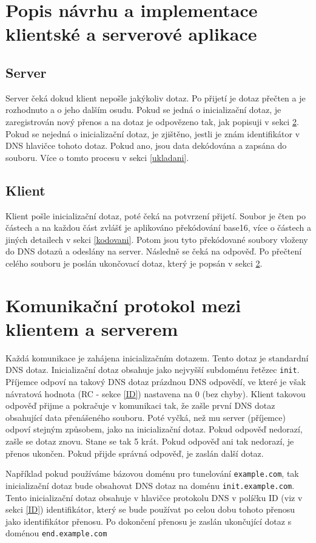\documentclass[11pt]{article}
\begin{document}
\section{Popis návrhu a implementace klientské a serverové aplikace}
\subsection{Server}
Server čeká dokud klient nepošle jakýkoliv dotaz. Po přijetí je dotaz přečten a je rozhodnuto a o jeho dalším osudu. Pokud se jedná o inicializační dotaz, je zaregistrován nový přenos a na dotaz je odpovězeno tak, jak popisuji v sekci \ref{protokol}. Pokud se nejedná o inicializační dotaz, je zjištěno, jestli je znám identifikátor v DNS hlavičce tohoto dotaz. Pokud ano, jsou data dekódována a zapsána do souboru. Více o tomto procesu v sekci \ref{ukladani}.

\subsection{Klient}
Klient pošle inicializační dotaz, poté čeká na potvrzení přijetí. Soubor je čten po částech a na každou část zvlášť je aplikováno překódování base16, více o částech a jiných detailech v sekci \ref{kodovani}. Potom jsou tyto překódované soubory vloženy do DNS dotazů a odeslány na server. Následně se čeká na odpověď. Po přečtení celého souboru je poslán ukončovací dotaz, který je popsán v sekci \ref{protokol}.



\section{Komunikační protokol mezi klientem a serverem} \label{protokol}
Každá komunikace je zahájena inicializačním dotazem. Tento dotaz je standardní DNS dotaz. Inicializační dotaz obsahuje jako nejvyšší subdoménu řetězec \texttt{init}. Příjemce odpoví na takový DNS dotaz prázdnou DNS odpovědí, ve které je však návratová hodnota (RC - sekce \ref{ID}) nastavena na 0 (bez chyby). Klient takovou odpověď přijme a pokračuje v komunikaci tak, že zašle první DNS dotaz obsahující data přenášeného souboru. Poté vyčká, než mu server (příjemce) odpoví stejným způsobem, jako na inicializační dotaz. Pokud odpověď nedorazí, zašle se dotaz znovu. Stane se tak 5 krát. Pokud odpověď ani tak nedorazí, je přenos ukončen. Pokud přijde správná odpověď, je zaslán další dotaz.

Například pokud používáme bázovou doménu pro tunelování \texttt{example.com}, tak inicializační dotaz bude obsahovat DNS dotaz na doménu \texttt{init.example.com}. Tento inicializační dotaz obsahuje v hlavičce protokolu DNS v políčku ID (viz v sekci \ref{ID}) identifikátor, který se bude používat po celou dobu tohoto přenosu jako identifikátor přenosu. Po dokončení přenosu je zaslán ukončující dotaz s doménou \texttt{end.example.com}
\end{document}
